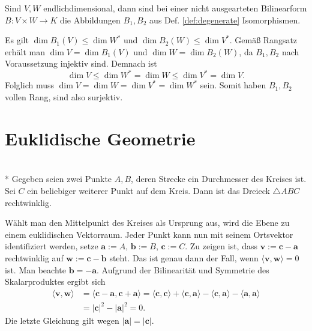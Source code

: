 \begin{Satz}
Sind $V,W$ endlichdimensional, dann sind bei einer nicht ausgearteten
Bilinearform $B\colon V\times W\to K$ die Abbildungen $B_1,B_2$ aus
Def. \ref{def:degenerate} Isomorphismen.
\end{Satz}
\begin{Beweis}
Es gilt $\dim B_1(V)\le\dim W^*$ und $\dim B_2(W)\le\dim V^*$. Gemäß
Rangsatz erhält man $\dim V=\dim B_1(V)$ und $\dim W=\dim B_2(W)$,
da $B_1,B_2$ nach Voraussetzung injektiv sind. Demnach ist
\begin{equation}
\dim V \le \dim W^* = \dim W \le \dim V^* = \dim V.
\end{equation}
Folglich muss $\dim V=\dim W=\dim V^*=\dim W^*$ sein. Somit haben
$B_1,B_2$ vollen Rang, sind also surjektiv.\;\qedsymbol
\end{Beweis}

\newpage
\section{Euklidische Geometrie}

\begin{Satz}\mbox{}\\*
Gegeben seien zwei Punkte $A,B$, deren Strecke ein Durchmesser
des Kreises ist. Sei $C$ ein beliebiger weiterer Punkt auf dem
Kreis. Dann ist das Dreieck $\triangle ABC$ rechtwinklig.
\end{Satz}
\begin{Beweis}
Wählt man den Mittelpunkt des Kreises als Ursprung aus, wird die
Ebene zu einem euklidischen Vektorraum. Jeder Punkt kann nun mit
seinem Ortsvektor identifiziert werden, setze $\mathbf a := A$,
$\mathbf b := B$, $\mathbf c := C$. Zu zeigen ist, dass
$\mathbf v:=\mathbf c-\mathbf a$ rechtwinklig auf
$\mathbf w:=\mathbf c-\mathbf b$  steht. Das ist genau dann der Fall,
wenn $\langle\mathbf v,\mathbf w\rangle = 0$ ist.
Man beachte $\mathbf b = -\mathbf a$. Aufgrund der Bilinearität und
Symmetrie des Skalarproduktes ergibt sich%
\begin{align}
\langle\mathbf v,\mathbf w\rangle
&= \langle\mathbf c-\mathbf a,\mathbf c+\mathbf a\rangle
= \langle\mathbf c,\mathbf c\rangle
+ \langle\mathbf c,\mathbf a\rangle
- \langle\mathbf c,\mathbf a\rangle
- \langle\mathbf a,\mathbf a\rangle\\
&= |\mathbf c|^2-|\mathbf a|^2 = 0.
\end{align}
Die letzte Gleichung gilt wegen $|\mathbf a|=|\mathbf c|$.\;\qedsymbol
\end{Beweis}

